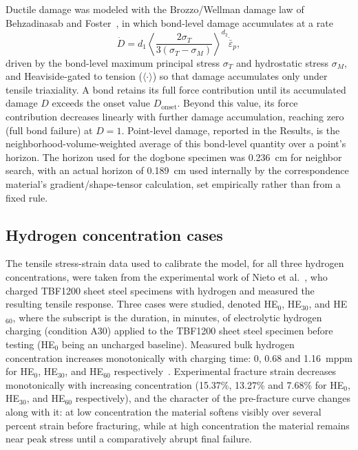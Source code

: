 \documentclass[pdflatex,sn-mathphys-num]{sn-jnl}%
\theoremstyle{thmstyleone}%
\theoremstyle{thmstyletwo}%
\theoremstyle{thmstylethree}%
\begin{document}
Ductile damage was modeled with the Brozzo/Wellman damage law of Behzadinasab and Foster~\cite{behzadinasab2020revisiting}, in which
bond-level damage accumulates at a rate
\begin{equation}
  \dot D = d_1 \left\langle \frac{2\sigma_T}{3(\sigma_T - \sigma_M)} \right\rangle^{d_2} \dot{\bar\varepsilon}_p,
\end{equation}
driven by the bond-level maximum principal stress $\sigma_T$ and hydrostatic stress $\sigma_M$, and
Heaviside-gated to tension ($\langle\cdot\rangle$) so that damage accumulates only under tensile
triaxiality. A bond retains its full force contribution until its accumulated damage $D$ exceeds
the onset value $D_\mathrm{onset}$. Beyond this value, its force contribution decreases linearly with
further damage accumulation, reaching zero (full bond failure) at $D=1$. Point-level damage, reported in the Results, is the
neighborhood-volume-weighted average of this bond-level quantity over a point's horizon. The horizon
used for the dogbone specimen was 0.236~cm for neighbor search, with an actual horizon of 0.189~cm
used internally by the correspondence material's gradient/shape-tensor calculation, set empirically
rather than from a fixed rule.

\subsection{Hydrogen concentration cases}\label{subsec2b}

The tensile stress-strain data used to calibrate the model, for all three hydrogen concentrations,
were taken from the experimental work of Nieto et al.~\cite{nieto2024thesis}, who charged TBF1200
sheet steel specimens with hydrogen and measured the resulting tensile response. Three cases were
studied, denoted HE$_{0}$, HE$_{30}$, and HE$_{60}$, where the subscript is the duration,
in minutes, of electrolytic hydrogen charging (condition A30) applied to the TBF1200 sheet steel
specimen before testing (HE$_{0}$ being an uncharged baseline). Measured bulk hydrogen concentration
increases monotonically with charging time: 0, 0.68 and 1.16~mppm for HE$_{0}$, HE$_{30}$, and
HE$_{60}$ respectively~\cite{nieto2024thesis}.
Experimental fracture strain decreases monotonically with increasing concentration (15.37\%,
13.27\% and 7.68\% for HE$_{0}$, HE$_{30}$, and HE$_{60}$ respectively), and the
character of the pre-fracture curve changes along with it: at low concentration the material
softens visibly over several percent strain before fracturing, while at high concentration the
material remains near peak stress until a comparatively abrupt final failure.
\end{document}
